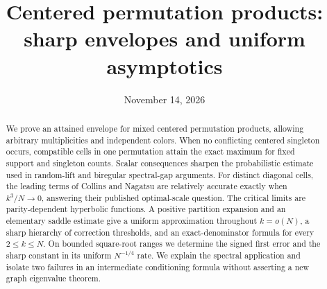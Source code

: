 \documentclass[11pt]{article}
\title{Centered permutation products:\\ sharp envelopes and uniform asymptotics}
\author{}
\date{November 14, 2026}
\theoremstyle{definition}
\theoremstyle{remark}
\newcommand{\1}{\mathbf 1}
\begin{document}
\maketitle
\begin{abstract}
We prove an attained envelope for mixed centered permutation products, allowing arbitrary multiplicities and independent colors. When no conflicting centered singleton occurs, compatible cells in one permutation attain the exact maximum for fixed support and singleton counts. Scalar consequences sharpen the probabilistic estimate used in random-lift and biregular spectral-gap arguments. For distinct diagonal cells, the leading terms of Collins and Nagatsu are relatively accurate exactly when $k^3/N\to0$, answering their published optimal-scale question. The critical limits are parity-dependent hyperbolic functions. A positive partition expansion and an elementary saddle estimate give a uniform approximation throughout $k=o(N)$, a sharp hierarchy of correction thresholds, and an exact-denominator formula for every $2\le k\le N$. On bounded square-root ranges we determine the signed first error and the sharp constant in its uniform $N^{-1/4}$ rate. We explain the spectral application and isolate two failures in an intermediate conditioning formula without asserting a new graph eigenvalue theorem.
\end{abstract}
\tableofcontents
\clearpage










\appendix

\end{document}
